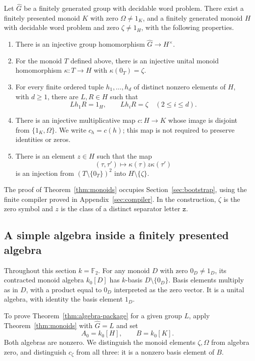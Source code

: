 \begin{theorem}\label{thm:monoids}
Let \(\widehat G\) be a finitely generated group with decidable word
problem.  There exist a finitely presented monoid \(K\) with zero
\(\Omega\ne1_K\), and a finitely generated monoid \(H\) with decidable
word problem and zero \(\zeta\ne1_H\), with the following properties.
\begin{enumerate}[label=\textup{(\roman*)}]
\item There is an injective group homomorphism
\(\widehat G\longrightarrow H^\times\).
\item For the monoid \(T\) defined above, there is an injective unital
monoid homomorphism \(\kappa:T\longrightarrow H\) with
\(\kappa(0_T)=\zeta\).
\item For every finite ordered tuple \(h_1,\ldots,h_d\) of distinct
nonzero elements of \(H\), with \(d\ge1\), there are \(L,R\in H\)
such that
\[
 Lh_1R=1_H,\qquad Lh_iR=\zeta\quad(2\le i\le d).
\]
\item There is an injective multiplicative map \(c:H\longrightarrow K\)
whose image is disjoint from \(\{1_K,\Omega\}\).  We write
\(c_h=c(h)\); this map is not required to preserve identities or zeros.
\item There is an element \(z\in H\) such that the map
\[
 (\tau,\tau')\longmapsto\kappa(\tau)z\kappa(\tau')
\]
is an injection from \((T\setminus\{0_T\})^2\) into
\(H\setminus\{\zeta\}\).
\end{enumerate}
\end{theorem}

The proof of Theorem~\ref{thm:monoids} occupies
Section~\ref{sec:bootstrap}, using the finite compiler proved in
Appendix~\ref{sec:compiler}. In the construction, \(\zeta\) is the zero
symbol and \(z\) is the class of a distinct separator letter
\(\mathtt z\).

\subsection{A simple algebra inside a finitely presented algebra}

Throughout this section \(k=\mathbb F_2\).
For any monoid \(D\) with zero \(0_D\ne1_D\), its contracted monoid
algebra \(k_0[D]\) has \(k\)-basis \(D\setminus\{0_D\}\).  Basis
elements multiply as in \(D\), with a product equal to \(0_D\)
interpreted as the zero vector.  It is a unital algebra, with identity
the basis element \(1_D\).

To prove Theorem~\ref{thm:algebra-package} for a given group \(L\),
apply Theorem~\ref{thm:monoids} with \(\widehat G=L\) and set
\[
 A_0=k_0[H],\qquad B=k_0[K].
\]
Both algebras are nonzero.  We distinguish the monoid elements
\(\zeta,\Omega\) from algebra zero, and distinguish \(c_{\zeta}\)
from all three: it is a nonzero basis element of \(B\).

